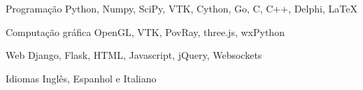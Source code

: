 \begin{cvskills}

  \cvskill
    {Programação} %
    {Python, Numpy, SciPy, VTK, Cython, Go, C, C++, Delphi, LaTeX} %
    
  \cvskill
  	{Computação gráfica}
  	{OpenGL, VTK, PovRay, three.js, wxPython}

  \cvskill
    {Web} %
    {Django, Flask, HTML, Javascript, jQuery, Websockets} %

  \cvskill
    {Idiomas} %
    {Inglês, Espanhol e Italiano} %

\end{cvskills}